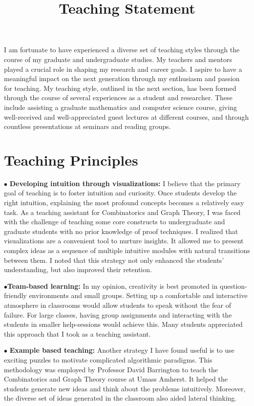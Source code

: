 \documentclass[11pt,a4paper,sans]{moderncv} %
\title{Teaching Statement}
\begin{document}
\makecvtitle %
I am fortunate to have experienced a diverse set of teaching styles through the course of my graduate and undergraduate studies. My teachers and mentors played a crucial role in shaping my research and career goals. I aspire to have a meaningful impact on the next generation through my enthusiasm and passion for teaching. My teaching style, outlined in the next section, has been formed through the course of several experiences as a student and researcher. These include assisting a graduate mathematics and computer science course, giving well-received and well-appreciated guest lectures at different courses, and through countless presentations at seminars and reading groups.

\section{Teaching Principles}

$\bullet{}$ \textbf{Developing intuition through visualizations:} I believe that the primary goal of teaching is to foster intuition and curiosity. Once students develop the right intuition, explaining the most profound concepts becomes a relatively easy task. As a teaching assistant for Combinatorics and Graph Theory, I was faced with the challenge of teaching some core constructs to undergraduate and graduate students with no prior knowledge of proof techniques. I realized that visualizations are a convenient tool to nurture insights. It allowed me to present complex ideas as a sequence of multiple intuitive modules with natural transitions between them. I noted that this strategy not only enhanced the students' understanding, but also improved their retention.

$\bullet{}$\textbf{Team-based learning:} In my opinion, creativity is best promoted in question-friendly environments and small groups. Setting up a comfortable and interactive atmosphere in classrooms would allow students to speak without the fear of failure. For large classes, having group assignments and interacting with the students in smaller help-sessions would achieve this. Many students appreciated this approach that I took as a teaching assistant.

$\bullet{}$ \textbf{Example based teaching:} Another strategy I have found useful is to use exciting puzzles to motivate complicated algorithmic paradigms. This methodology was employed by Professor David Barrington to teach the Combinatorics and Graph Theory course at Umass Amherst. It helped the students generate new ideas and think about the problems intuitively. Moreover, the diverse set of ideas generated in the classroom also aided lateral thinking. 
\end{document}

